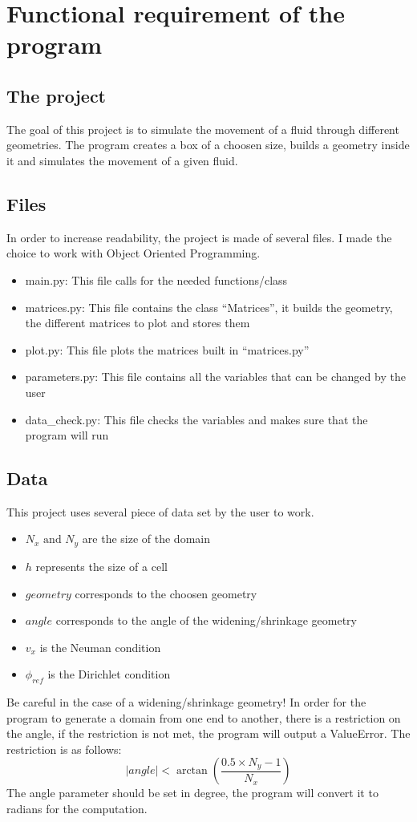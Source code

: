 \section{Functional requirement of the program}
\subsection{The project}
The goal of this project is to simulate the movement of a fluid through
different geometries. The program creates a box of a choosen size, builds a
geometry inside it and simulates the movement of a given fluid.

\subsection{Files}
In order to increase readability, the project is made of several files.
I made the choice to work with Object Oriented Programming.
\begin{itemize}
    \item main.py: This file calls for the needed functions/class
    \item matrices.py: This file contains the class ``Matrices'', it builds the
          geometry, the different matrices to plot and stores them
    \item plot.py: This file plots the matrices built in ``matrices.py''
    \item parameters.py: This file contains all the variables that can be 
          changed by the user
    \item data\_check.py: This file checks the variables and makes sure that
          the program will run
\end{itemize}

\subsection{Data}
This project uses several piece of data set by the user to work.
\begin{itemize}
    \item $N_x \text{ and } N_y$ are the size of the domain
    \item $h$ represents the size of a cell
    \item $geometry$ corresponds to the choosen geometry
    \item $angle$ corresponds to the angle of the widening/shrinkage geometry
    \item $v_x$ is the Neuman condition
    \item $\phi_{ref}$ is the Dirichlet condition
\end{itemize}
Be careful in the case of a widening/shrinkage geometry!
In order for the program to generate a domain from one end to another, there is
a restriction on the angle, if the restriction is not met, the program will
output a ValueError. The restriction is as follows:
\[
      |angle| < \arctan{\left(\dfrac{0.5 \times N_y - 1}{N_x}\right)}
\]
The angle parameter should be set in degree, the program will convert it to
radians for the computation.

